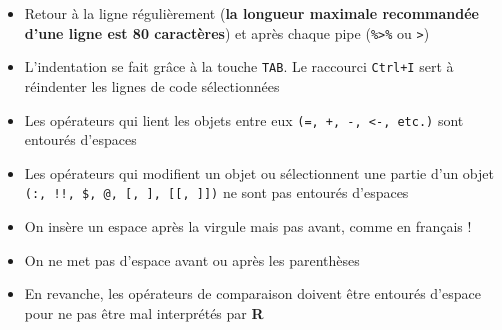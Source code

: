\documentclass[
  french,
  10pt,
  a4paper,
]{article}
\newenvironment{Shaded}{}{}
\newcommand{\CommentTok}[1]{\textcolor[rgb]{0.63,0.63,0.65}{\textit{#1}}}
\newcommand{\DecValTok}[1]{\textcolor[rgb]{0.60,0.41,0.00}{#1}}
\newcommand{\NormalTok}[1]{\textcolor[rgb]{0.22,0.23,0.26}{#1}}
\newcommand{\OtherTok}[1]{\textcolor[rgb]{0.15,0.68,0.38}{#1}}
\newcommand{\SpecialCharTok}[1]{\textcolor[rgb]{0.00,0.52,0.74}{#1}}
\providecommand{\tightlist}{%
  \setlength{\itemsep}{0pt}\setlength{\parskip}{0pt}}
\begin{document}
\begin{tcolorbox}[enhanced jigsaw, arc=.35mm, bottomrule=.15mm, bottomtitle=1mm, breakable, colback=white, colbacktitle=quarto-callout-note-color!10!white, colframe=quarto-callout-note-color-frame, coltitle=black, left=2mm, leftrule=.75mm, opacityback=0, opacitybacktitle=0.6, rightrule=.15mm, title=\textcolor{quarto-callout-note-color}{\faInfo}\hspace{0.5em}{Respecter des règles pour faciliter la lecture}, titlerule=0mm, toprule=.15mm, toptitle=1mm]

\begin{itemize}
\tightlist
\item
  Retour à la ligne régulièrement (\textbf{la longueur maximale
  recommandée d'une ligne est 80 caractères}) et après chaque pipe
  (\texttt{\%\textgreater{}\%} ou \texttt{\textbar{}\textgreater{}})\\
\item
  L'indentation se fait grâce à la touche \texttt{TAB}. Le raccourci
  \texttt{Ctrl+I} sert à réindenter les lignes de code sélectionnées\\
\item
  Les opérateurs qui lient les objets entre eux
  \texttt{(=,\ +,\ -,\ \textless{}-,\ etc.)} sont entourés d'espaces\\
\item
  Les opérateurs qui modifient un objet ou sélectionnent une partie d'un
  objet \texttt{(:,\ !!,\ \$,\ @,\ {[},\ {]},\ {[}{[},\ {]}{]})} ne sont
  pas entourés d'espaces
\end{itemize}

\begin{Shaded}
\end{Shaded}

\begin{Shaded}
\end{Shaded}

\begin{itemize}
\tightlist
\item
  On insère un espace après la virgule mais pas avant, comme en français
  !\\
\item
  On ne met pas d'espace avant ou après les parenthèses\\
\item
  En revanche, les opérateurs de comparaison doivent être entourés
  d'espace pour ne pas être mal interprétés par \textbf{R}
\end{itemize}


\end{tcolorbox}
\end{document}
